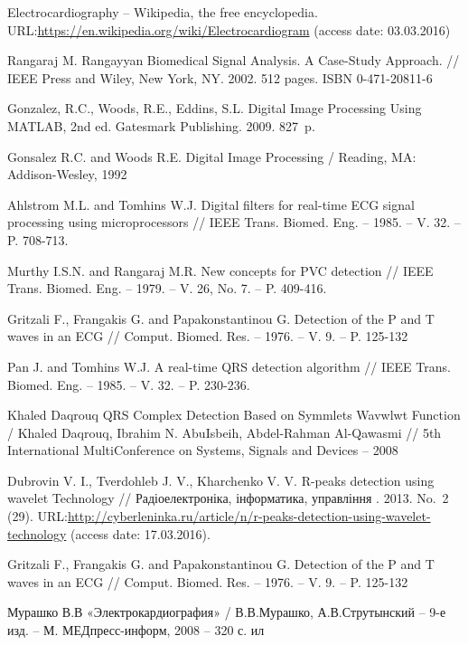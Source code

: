 \documentclass[runningheads]{AIIT}
\begin{document}
%
%
 \begin{thebibliography}{99}
  Electrocardiography -- Wikipedia, the free encyclopedia. URL:\url{https://en.wikipedia.org/wiki/Electrocardiogram} (access date: 03.03.2016)

  Rangaraj M. Rangayyan Biomedical Signal Analysis. A Case-Study Approach. // IEEE Press and Wiley, New York, NY. 2002. 512 pages. ISBN 0-471-20811-6

  Gonzalez, R.C., Woods, R.E., Eddins, S.L. Digital Image Processing Using MATLAB, 2nd ed. Gatesmark Publishing. 2009. 827~p.

  Gonsalez R.C. and Woods R.E. Digital Image Processing / Reading, MA: Addison-Wesley, 1992

  Ahlstrom M.L. and Tomhins W.J. Digital filters for real-time ECG signal processing using microprocessors // IEEE Trans. Biomed. Eng. – 1985. – V. 32. – P. 708-713.

  Murthy I.S.N. and Rangaraj M.R. New concepts for PVC detection // IEEE Trans. Biomed. Eng. – 1979. – V. 26, No. 7. – P. 409-416.

  Gritzali F., Frangakis G. and Papakonstantinou G. Detection of the P and T waves in an ECG // Comput. Biomed. Res. – 1976. – V. 9. – P. 125-132

  Pan J. and Tomhins W.J. A real-time QRS detection algorithm // IEEE Trans. Biomed. Eng. – 1985. – V. 32. – P. 230-236.

  Khaled Daqrouq QRS Complex Detection Based on Symmlets Wavwlwt Function / Khaled Daqrouq, Ibrahim N. AbuIsbeih, Abdel-Rahman Al-Qawasmi // 5th International MultiConference on Systems, Signals and Devices – 2008

  Dubrovin V. I., Tverdohleb J. V., Kharchenko V. V. R-peaks detection using wavelet Technology // Радіоелектроніка, інформатика, управління . 2013. No.~2 (29). URL:\url{http://cyberleninka.ru/article/n/r-peaks-detection-using-wavelet-technology} (access date: 17.03.2016).

  Gritzali F., Frangakis G. and Papakonstantinou G. Detection of the P and T waves in an ECG // Comput. Biomed. Res. – 1976. – V. 9. – P. 125-132

  Мурашко В.В «Электрокардиография» / В.В.Мурашко, А.В.Струтынский – 9-е изд. – М. МЕДпресс-информ, 2008 – 320 с. ил

 \end{thebibliography}
\end{document}
